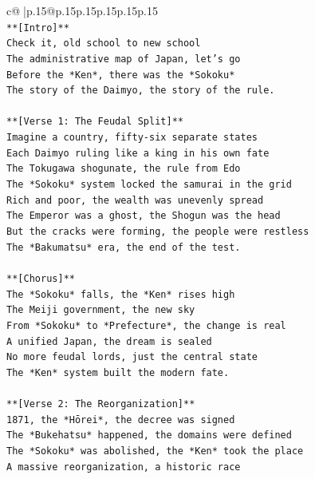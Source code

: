 \documentclass{article}
\begin{document}
{\begin{supertabular}{c@{$\;$}|p{.15\linewidth}@{}p{.15\linewidth}p{.15\linewidth}p{.15\linewidth}p{.15\linewidth}p{.15\linewidth}}
{{{\\ 
\texttt{**{[}Intro{]}**} \\
\texttt{Check it, old school to new school} \\
\texttt{The administrative map of Japan, let's go} \\
\texttt{Before the *Ken*, there was the *Sokoku*} \\
\texttt{The story of the Daimyo, the story of the rule.} \\
\\ 
\texttt{**{[}Verse 1: The Feudal Split{]}**} \\
\texttt{Imagine a country, fifty{-}six separate states} \\
\texttt{Each Daimyo ruling like a king in his own fate} \\
\texttt{The Tokugawa shogunate, the rule from Edo} \\
\texttt{The *Sokoku* system locked the samurai in the grid} \\
\texttt{Rich and poor, the wealth was unevenly spread} \\
\texttt{The Emperor was a ghost, the Shogun was the head} \\
\texttt{But the cracks were forming, the people were restless} \\
\texttt{The *Bakumatsu* era, the end of the test.} \\
\\ 
\texttt{**{[}Chorus{]}**} \\
\texttt{The *Sokoku* falls, the *Ken* rises high} \\
\texttt{The Meiji government, the new sky} \\
\texttt{From *Sokoku* to *Prefecture*, the change is real} \\
\texttt{A unified Japan, the dream is sealed} \\
\texttt{No more feudal lords, just the central state} \\
\texttt{The *Ken* system built the modern fate.} \\
\\ 
\texttt{**{[}Verse 2: The Reorganization{]}**} \\
\texttt{1871, the *Hōrei*, the decree was signed} \\
\texttt{The *Bukehatsu* happened, the domains were defined} \\
\texttt{The *Sokoku* was abolished, the *Ken* took the place} \\
\texttt{A massive reorganization, a historic race} \\
}}}
\end{supertabular}}
\end{document}
